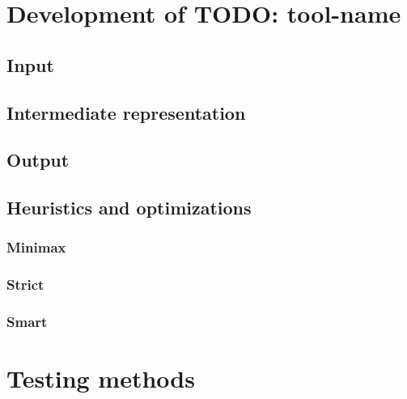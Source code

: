 \chapter{Development of TODO: tool-name}
\section{Input}
\section{Intermediate representation}
\section{Output}
\section{Heuristics and optimizations}
\subsection{Minimax}
\subsection{Strict}
\subsection{Smart}


\chapter{Testing methods}


